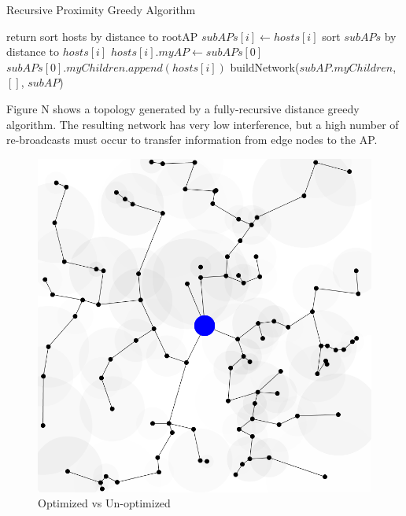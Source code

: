 \documentclass{sigcomm-alternate}
\begin{document}
\begin{algorithm}[H]
\caption{Recursive Proximity Greedy Algorithm}
\begin{algorithmic}[H]
\State return
\EndIf
\State sort hosts by distance to rootAP
\State $subAPs[i]\gets hosts[i]$
\EndFor
{}
\State sort $subAPs$ by distance to $hosts[i]$
\State $hosts[i].myAP \gets subAPs[0]$
\State $subAPs[0].myChildren.append(hosts[i])$
\EndFor
{}
\State buildNetwork($subAP.myChildren$, $[]$, $subAP$)
\EndFor
\EndProcedure
\end{algorithmic}
\end{algorithm}

Figure N shows a topology generated by a fully-recursive distance greedy algorithm. The resulting network has very low interference, but a high number of re-broadcasts must occur to transfer information from edge nodes to the AP.

\begin{figure}[H]
\centering
\includegraphics[scale=0.15]{erikFullyRecursive.png}
\caption{Optimized vs Un-optimized}
\end{figure}
\end{document}
